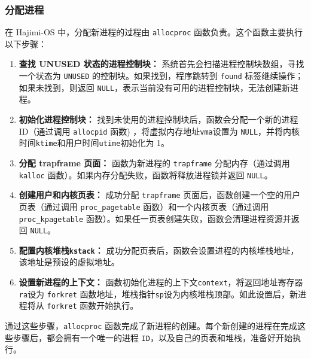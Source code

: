 \documentclass[UTF8]{article}
\begin{document}
\subsubsection{分配进程}
在 Hajimi-OS 中，分配新进程的过程由 \texttt{allocproc} 函数负责。这个函数主要执行以下步骤：
\begin{enumerate}[label=\textbf{\arabic*}., wide, labelwidth=!, labelindent=0pt]
  \item \textbf{查找 UNUSED 状态的进程控制块：} 系统首先会扫描进程控制块数组，寻找一个状态为 \texttt{UNUSED} 的控制块。如果找到，程序跳转到 \texttt{found} 标签继续操作；如果未找到，则返回 \texttt{NULL}，表示当前没有可用的进程控制块，无法创建新进程。
  \item \textbf{初始化进程控制块：} 找到未使用的进程控制块后，函数会分配一个新的进程 ID（通过调用 \texttt{allocpid} 函数) ，将虚拟内存地址\texttt{vma}设置为 \texttt{NULL}，并将内核时间\texttt{ktime}和用户时间\texttt{utime}初始化为 1。
  \item \textbf{分配 trapframe 页面：} 函数为新进程的 \texttt{trapframe} 分配内存（通过调用 \texttt{kalloc} 函数）。如果内存分配失败，函数将释放进程锁并返回 \texttt{NULL}。
  \item \textbf{创建用户和内核页表：} 成功分配 \texttt{trapframe} 页面后，函数创建一个空的用户页表（通过调用 \texttt{proc\_pagetable} 函数）和一个内核页表（通过调用 \texttt{proc\_kpagetable} 函数）。如果任一页表创建失败，函数会清理进程资源并返回 \texttt{NULL}。
  \item \textbf{配置内核堆栈\texttt{kstack}：} 成功分配页表后，函数会设置进程的内核堆栈地址，该地址是预设的虚拟地址。
  \item \textbf{设置新进程的上下文：} 函数初始化进程的上下文\texttt{context}，将返回地址寄存器\texttt{ra}设为 \texttt{forkret} 函数地址，堆栈指针\texttt{sp}设为内核堆栈顶部。如此设置后，新进程将从 \texttt{forkret} 函数开始执行。
\end{enumerate}
通过这些步骤，\texttt{allocproc} 函数完成了新进程的创建。每个新创建的进程在完成这些步骤后，都会拥有一个唯一的进程 \texttt{ID}，以及自己的页表和堆栈，准备好开始执行。
\end{document}
